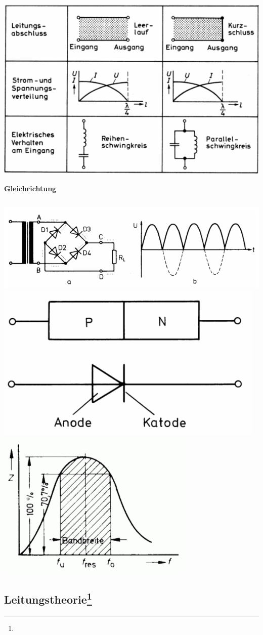 \documentclass[12pt,a4paper, twoside]{article}
\renewcommand{\=}[1]{\stackrel{#1}{=}}
\theoremstyle{definition}
\theoremstyle{remark}
\newcommand{\concept}[2]{%
\noindent
\begin{framed}
\noindent\textbf{#1}
\par\begin{tabular}{p{0.9\linewidth}}
#2
\end{tabular}
\end{framed}
}
\begin{document}
\includegraphics[width=0.9\linewidth]{pic/lecherleitung.png}


\concept{Gleichrichtung}{

}

\includegraphics[width=\linewidth]{pic/fbr.png}\\
\includegraphics[width=0.55\linewidth]{pic/pn-ak.png}
\includegraphics[width=0.40\linewidth]{pic/bandbreite.png}



\subsection[Leitungstheorie]{Leitungstheorie\let\thefootnote\relax\footnote{}}
\end{document}
